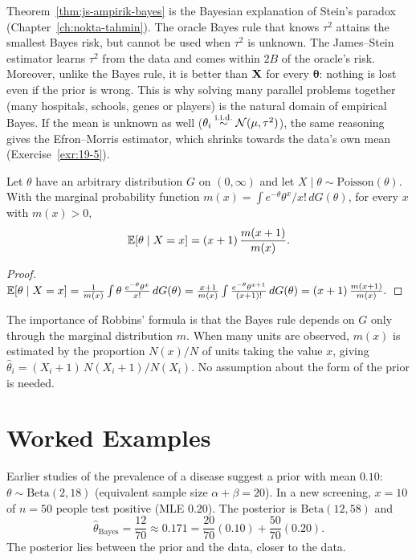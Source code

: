 \documentclass[main.tex]{subfiles}
\begin{document}
\begin{remark}
Theorem~\ref{thm:js-ampirik-bayes} is the Bayesian explanation of Stein's paradox (Chapter~\ref{ch:nokta-tahmin}). The oracle Bayes rule that knows $\tau^2$ attains the smallest Bayes risk, but cannot be used when $\tau^2$ is unknown. The James--Stein estimator learns $\tau^2$ from the data and comes within $2B$ of the oracle's risk. Moreover, unlike the Bayes rule, it is better than $\mathbf{X}$ for every $\bm\theta$: nothing is lost even if the prior is wrong. This is why solving many parallel problems together (many hospitals, schools, genes or players) is the natural domain of empirical Bayes. If the mean is unknown as well ($\theta_i\overset{\text{i.i.d.}}{\sim}\mathcal{N}(\mu,\tau^2)$), the same reasoning gives the Efron--Morris estimator, which shrinks towards the data's own mean (Exercise~\ref{exr:19-5}).
\end{remark}

\begin{proposition}\label{prop:robbins}
Let $\theta$ have an arbitrary distribution $G$ on $(0,\infty)$ and let $X\mid\theta\sim\text{Poisson}(\theta)$. With the marginal probability function $m(x)=\int e^{-\theta}\theta^x/x!\,dG(\theta)$, for every $x$ with $m(x)>0$,
\[
\mathbb{E}[\theta\mid X=x]=(x+1)\,\frac{m(x+1)}{m(x)}.
\]
\end{proposition}
\begin{proof}
$\mathbb{E}[\theta\mid X=x]=\frac{1}{m(x)}\int\theta\,\frac{e^{-\theta}\theta^x}{x!}\,dG(\theta)=\frac{x+1}{m(x)}\int\frac{e^{-\theta}\theta^{x+1}}{(x+1)!}\,dG(\theta)=(x+1)\,\frac{m(x+1)}{m(x)}.$
\end{proof}

The importance of Robbins' formula is that the Bayes rule depends on $G$ only through the marginal distribution $m$. When many units are observed, $m(x)$ is estimated by the proportion $N(x)/N$ of units taking the value $x$, giving $\hat\theta_i=(X_i+1)\,N(X_i+1)/N(X_i)$. No assumption about the form of the prior is needed.

\section{Worked Examples}

\begin{example}\label{ex:beta-binom-sayisal}
Earlier studies of the prevalence of a disease suggest a prior with mean $0.10$: $\theta\sim\text{Beta}(2,18)$ (equivalent sample size $\alpha+\beta=20$). In a new screening, $x=10$ of $n=50$ people test positive (MLE $0.20$). The posterior is $\text{Beta}(12,58)$ and
\[
\hat\theta_{\text{Bayes}}=\frac{12}{70}\approx0.171=\frac{20}{70}(0.10)+\frac{50}{70}(0.20).
\]
The posterior lies between the prior and the data, closer to the data.
\end{example}
\end{document}
